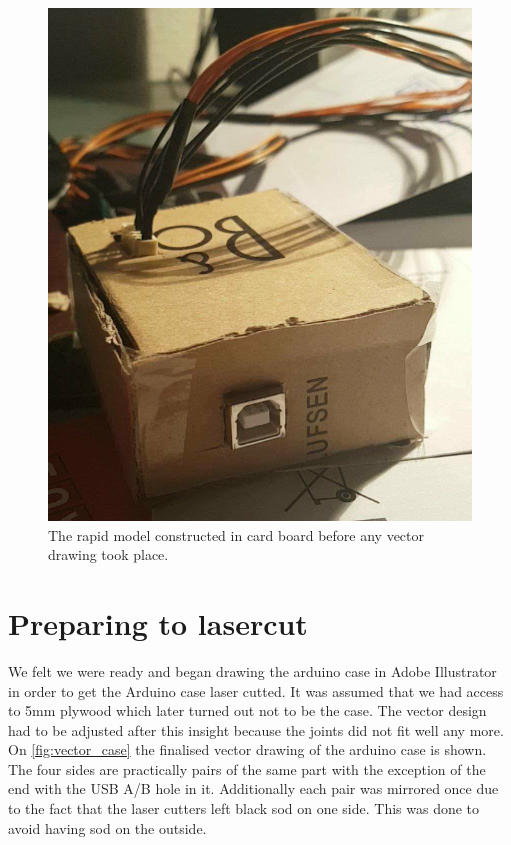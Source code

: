 \begin{figure}[htb]
\centering
\includegraphics[scale=0.75]{Figure/rapid_model.png}
\caption{The rapid model constructed in card board before any vector drawing took place.}
\label{fig:rapid_model}
\end{figure}

\section{Preparing to lasercut}
We felt we were ready and began drawing the arduino case in Adobe Illustrator in order to get the Arduino case laser cutted.  It was assumed that we had access to 5mm plywood which later turned out not to be the case. The vector design had to be adjusted after this insight because the joints did not fit well any more. On \autoref{fig:vector_case} the finalised vector drawing of the arduino case is shown. The four sides are practically pairs of the same part with the exception of the end with the USB A/B hole in it. Additionally each pair was mirrored once due to the fact that the laser cutters left black sod on one side. This was done to avoid having sod on the outside.

